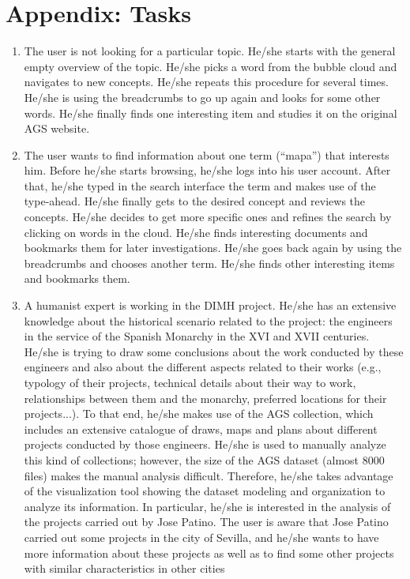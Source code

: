 \documentclass[11pt]{report}
\begin{document}
\chapter{Appendix: Tasks}
\label{app:tasks}
\begin{enumerate}
	\item The user is not looking for a particular topic. He/she starts with the general empty overview of the topic. He/she picks a word from the bubble cloud and navigates to new concepts. He/she repeats this procedure for several times. He/she is using the breadcrumbs to go up again and looks for some other words. He/she finally finds one interesting item and studies it on the original AGS website.
	\item The user wants to find information about one term (``mapa'') that interests him. Before he/she starts browsing, he/she logs into his user account. After that, he/she typed in the search interface the term and makes use of the type-ahead. He/she finally gets to the desired concept and reviews the concepts. He/she decides to get more specific ones and refines the search by clicking on words in the cloud. He/she finds interesting documents and bookmarks them for later investigations. He/she goes back again by using the breadcrumbs and chooses another term. He/she finds other interesting items and bookmarks them.
	\item A humanist expert is working in the DIMH project. He/she has an extensive knowledge about the historical scenario related to the project: the engineers in the service of the Spanish Monarchy in the XVI and XVII centuries. He/she is trying to draw some conclusions about the work conducted by these engineers and also about the different aspects related to their works (e.g., typology of their projects, technical details about their way to work, relationships between them and the monarchy, preferred locations for their projects...). To that end, he/she makes use of the AGS collection, which includes an extensive catalogue of draws, maps and plans about different projects conducted by those engineers.
He/she is used to manually analyze this kind of collections; however, the size of the AGS dataset (almost 8000 files) makes the manual analysis difficult. Therefore, he/she takes advantage of the visualization tool showing the dataset modeling and organization to analyze its information.
In particular, he/she is interested in the analysis of the projects carried out by Jose Patino. The user is aware that Jose Patino carried out some projects in the city of Sevilla, and he/she wants to have more information about these projects as well as to find some other projects with similar characteristics in other cities

\end{enumerate}
\end{document}
